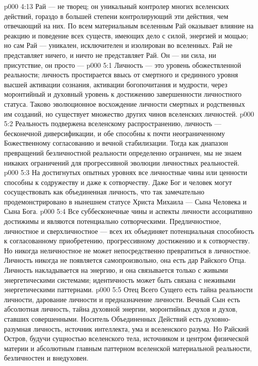 \vs p000 4:13 Рай --- не творец; он уникальный контролер многих вселенских действий, гораздо в большей степени контролирующий эти действия, чем отвечающий на них. По всем материальным вселенным Рай оказывает влияние на реакцию и поведение всех существ, имеющих дело с силой, энергией и мощью; но сам Рай --- уникален, исключителен и изолирован во вселенных. Рай не представляет ничего, и ничто не представляет Рай. Он --- ни сила, ни присутствие, он просто --- 
\vs p000 5:1 Личность --- это уровень обожествленной реальности; личность простирается ввысь от смертного и срединного уровня высшей активации сознания, активации богопочитания и мудрости, через моронтийный и духовный уровень к достижению завершенности личностного статуса. Таково эволюционное восхождение личности смертных и родственных им созданий, но существует множество других чинов вселенских личностей.
\vs p000 5:2 Реальность подвержена вселенскому распространению, личность --- бесконечной диверсификации, и обе способны к почти неограниченному Божественному согласованию и вечной стабилизации. Тогда как диапазон превращений безличностной реальности определенно ограничен, мы не знаем никаких ограничений для прогрессивной эволюции личностных реальностей.
\vs p000 5:3 На достигнутых опытных уровнях все личностные чины или ценности способны к содружеству и даже к сотворчеству. Даже Бог и человек могут сосуществовать как объединенная личность, что так замечательно продемонстрировано в нынешнем статусе Христа Михаила --- Сына Человека и Сына Бога.
\vs p000 5:4 Все суббесконечные чины и аспекты личности ассоциативно достижимы и являются потенциально сотворческими. Предличностное, личностное и сверхличностное --- всех их объединяет потенциальная способность к согласованному приобретению, прогрессивному достижению и к сотворчеству. Но никогда неличностное не может непосредственно превратиться в личностное. Личность никогда не появляется самопроизвольно, она есть дар Райского Отца. Личность накладывается на энергию, и она связывается только с живыми энергетическими системами; идентичность может быть связана с неживыми энергетическими паттернами.
\vs p000 5:5 \pc Отец Всего Сущего есть тайна реальности личности, дарование личности и предназначение личности. Вечный Сын есть абсолютная личность, тайна духовной энергии, моронтийных духов и духов, ставших совершенными. Носитель Объединенных Действий есть духовно\hyp{}разумная личность, источник интеллекта, ума и вселенского разума. Но Райский Остров, будучи сущностью вселенского тела, источником и центром физической материи и абсолютным главным паттерном вселенской материальной реальности, безличностен и внедуховен.
